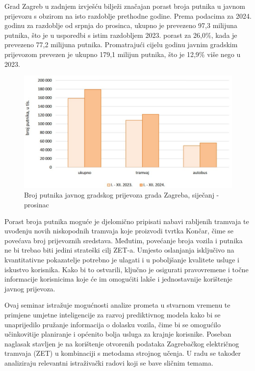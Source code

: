 \documentclass[seminarskirad]{fer}
\begin{document}
Grad Zagreb u zadnjem izvješću bilježi značajan porast broja putnika u javnom prijevozu s obzirom na isto razdoblje prethodne godine. Prema podacima za 2024. godinu za razdoblje od srpnja do prosinca, ukupno je prevezeno 97,3 milijuna putnika, što je u usporedbi s istim razdobljem 2023. porast za 26,0\%, kada je prevezeno 77,2 milijuna putnika. Promatrajući cijelu godinu javnim gradskim prijevozom prevezen je ukupno 179,1 milijun putnika, što je 12,9\% više nego u 2023\cite{article4}.

\begin{figure}[htb]
	\centering
	\includegraphics[width=0.9\linewidth]{Figures/graf-prijevoz.jpg} 
	\caption{Broj putnika javnog gradskog prijevoza grada Zagreba, siječanj - prosinac}
	\label{graf:prijevoz}
\end{figure}

Porast broja putnika moguće je djelomično pripisati nabavi rabljenih tramvaja te uvođenju novih niskopodnih tramvaja koje proizvodi tvrtka Končar, čime se povećava broj prijevoznih sredstava. Međutim, povećanje broja vozila i putnika ne bi trebao biti jedini strateški cilj ZET-a. Umjesto oslanjanja isključivo na kvantitativne pokazatelje potrebno je ulagati i u poboljšanje kvalitete usluge i iskustvo korisnika. Kako bi to ostvarili, ključno je osigurati pravovremene i točne informacije korisnicima koje će im omogućiti lakše i jednostavnije korištenje javnog prijevoza.

Ovaj seminar istražuje mogućnosti analize prometa u stvarnom vremenu te primjene umjetne inteligencije za razvoj prediktivnog modela kako bi se unaprijedilo pružanje informacija o dolasku vozila, čime bi se omogućilo učinkovitije planiranje i općenito bolja usluga za krajnje korisnike. Poseban naglasak stavljen je na korištenje otvorenih podataka Zagrebačkog električnog tramvaja (ZET) u kombinaciji s metodama strojnog učenja. U radu se također analiziraju relevantni istraživački radovi koji se bave sličnim temama\cite{article1}\cite{article2}\cite{article3}.
\end{document}

